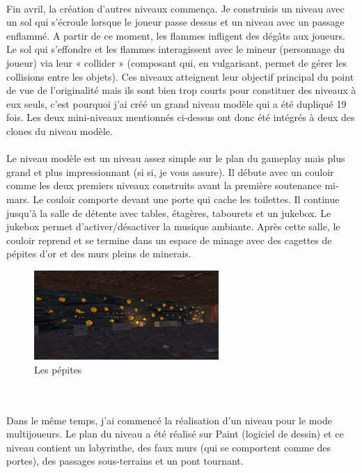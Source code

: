 \documentclass[titlepage, 13px, a4paper]{report}
\begin{document}
\paragraph*{} \hspace{0pt} 
Fin avril, la création d'autres niveaux commença. Je construisis un niveau avec un
sol qui s'écroule lorsque le joueur passe dessus et un niveau avec un passage
enflammé. A partir de ce moment, les flammes infligent des dégâts aux joueurs. Le
sol qui s'effondre et les flammes interagissent avec le mineur (personnage du
joueur) via leur « collider » (composant qui, en vulgarisant, permet de gérer les
collisions entre les objets). Ces niveaux atteignent leur objectif principal du point de vue de
l'originalité mais ils sont bien trop courts pour constituer des niveaux à eux seuls,
c'est pourquoi j'ai créé un grand niveau modèle qui a été dupliqué 19 fois. Les
deux mini-niveaux mentionnés ci-dessus ont donc été intégrés à deux des clones du
niveau modèle. \\


\paragraph*{} \hspace{0pt}
Le niveau modèle est un niveau assez simple sur le plan du gameplay mais plus
grand et plus impressionnant (si si, je vous assure). Il débute avec un couloir
comme les deux premiers niveaux construits avant la première soutenance mi-mars. 
Le couloir comporte devant une porte qui cache les toilettes. Il continue jusqu'à
la salle de détente avec tables, étagères, tabourets et un jukebox. Le jukebox
permet d'activer/désactiver la musique ambiante. Après cette salle, le couloir
reprend et se termine dans un espace de minage avec des cagettes de pépites
d'or et des murs pleins de minerais. 
\begin{figure}
  \centering
  \includegraphics[width=7cm]{images/antoine_pepite.png}
  \caption{Les pépites}
\end{figure}
\\

\paragraph*{} \hspace{0pt} 
Dans le même temps, j'ai commencé la réalisation d'un niveau pour le mode
multijoueurs. Le plan du niveau a été réalisé sur Paint (logiciel de dessin) et ce
niveau contient un labyrinthe, des faux murs (qui se comportent comme des
portes), des passages sous-terrains et un pont tournant. \\
 
\end{document}
